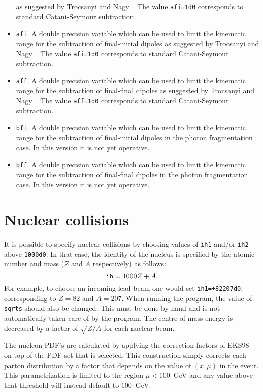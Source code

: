 \documentclass[12pt]{article}
\begin{document}
\begin{itemize}
as suggested by Trocsanyi and Nagy~\cite{Nagy:2003tz}.   
The value {\tt afi=1d0} corresponds 
to standard Catani-Seymour subtraction.
\item {\tt afi}.  
A double precision variable which can be used to
limit the kinematic range for the subtraction of final-initial dipoles
as suggested by Trocsanyi and Nagy~\cite{Nagy:2003tz}.   
The value {\tt afi=1d0} corresponds 
to standard Catani-Seymour subtraction.
\item {\tt aff}. 
A double precision variable which can be used to
limit the kinematic range for the subtraction of final-final dipoles
as suggested by Trocsanyi and Nagy~\cite{Nagy:2003tz}.   
The value {\tt aff=1d0} corresponds 
to standard Catani-Seymour subtraction.
\item {\tt bfi}. 
A double precision variable which can be used to
limit the kinematic range for the subtraction of final-initial dipoles
in the photon fragmentation case. In this version it is not yet operative.
\item {\tt bff}. 
A double precision variable which can be used to
limit the kinematic range for the subtraction of final-final dipoles
in the photon fragmentation case. In this version it is not yet operative.
\end{itemize}

\section{Nuclear collisions}
\label{sec:nucleus}

It is possible to specify nuclear collisions by choosing values
of {\tt ih1} and/or {\tt ih2} above {\tt 1000d0}. In that case,
the identity of the nucleus is specified by the atomic number
and mass ($Z$ and $A$ respectively) as follows:
\begin{equation}
{\tt ih} = 1000Z+A.
\end{equation}
For example, to choose an incoming lead beam one would set
{\tt ih1=+82207d0}, corresponding to $Z=82$ and $A=207$.
When running the program, the value of {\tt sqrts} should also be
changed. This must be done by hand and is not automatically taken
care of by the
program. The centre-of-mass energy is decreased by a factor of
$\sqrt{Z/A}$ for each nuclear beam. 

The nucleon PDF's are calculated by applying the correction
factors of EKS98~\cite{Eskola:1998df} on top of the PDF set that is selected.
This construction simply corrects each parton distribution by
a factor that depends on the value of $(x,\mu)$ in the event.
This parametrization is limited to the region $\mu < 100$~GeV and
any value above that threshold will instead default to $100$~GeV.
\end{document}
